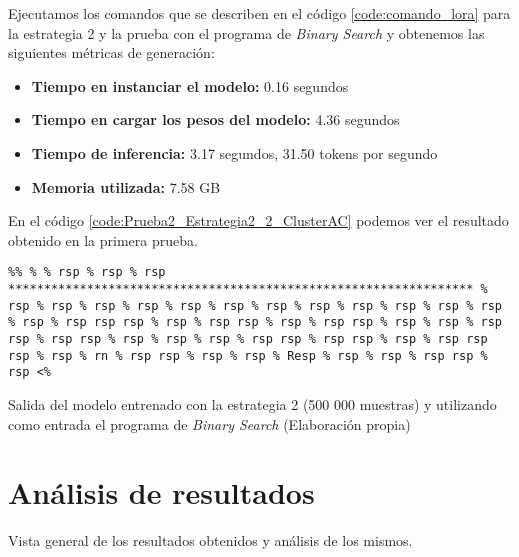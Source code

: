 Ejecutamos los comandos que se describen en el código \ref{code:comando_lora} para
la estrategia 2 y la prueba con el programa de \textit{Binary Search} y obtenemos
las siguientes métricas de generación:

\begin{itemize}
    \item \textbf{Tiempo en instanciar el modelo:} 0.16 segundos
    \item \textbf{Tiempo en cargar los pesos del modelo:} 4.36 segundos
    \item \textbf{Tiempo de inferencia:} 3.17 segundos, 31.50 tokens por segundo
    \item \textbf{Memoria utilizada:} 7.58 GB
\end{itemize}

En el código \ref{code:Prueba2_Estrategia2_2_ClusterAC} podemos ver el resultado obtenido
en la primera prueba.

\begin{mycode}
    \begin{verbatim}
%% % % rsp % rsp % rsp ***************************************************************** % rsp % rsp % rsp % rsp % rsp % rsp % rsp % rsp % rsp % rsp % rsp % rsp % rsp % rsp rsp rsp % rsp % rsp rsp % rsp % rsp rsp % rsp % rsp % rsp rsp % rsp rsp % rsp % rsp % rsp % rsp rsp % rsp rsp % rsp % rsp rsp rsp % rsp % rn % rsp rsp % rsp % rsp % Resp % rsp % rsp % rsp rsp % rsp <%
    \end{verbatim}
    \caption[Salida del modelo entrenado con la estrategia 2 (500 000 muestras) y utilizando como entrada el programa de \textit{Binary Search}]{Salida del modelo entrenado con la estrategia 2 (500 000 muestras) y utilizando como entrada el programa de \textit{Binary Search} (Elaboración propia)}
    \label{code:Prueba2_Estrategia2_2_ClusterAC}
\end{mycode}

\section{Análisis de resultados}
\label{sec:analisis_resultados}

Vista general de los resultados obtenidos y análisis de los mismos.